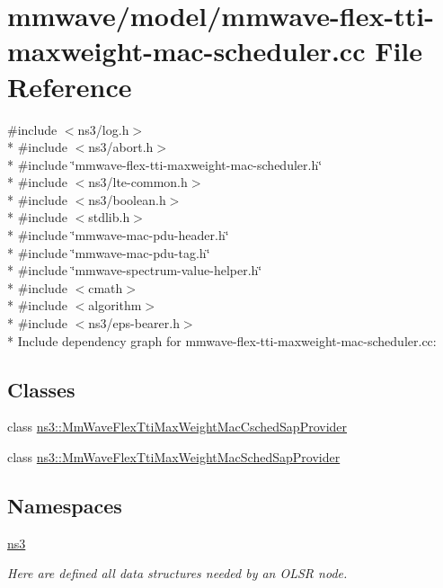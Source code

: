 \hypertarget{mmwave-flex-tti-maxweight-mac-scheduler_8cc}{}\section{mmwave/model/mmwave-\/flex-\/tti-\/maxweight-\/mac-\/scheduler.cc File Reference}
\label{mmwave-flex-tti-maxweight-mac-scheduler_8cc}
{\ttfamily \#include $<$ns3/log.\+h$>$}\\*
{\ttfamily \#include $<$ns3/abort.\+h$>$}\\*
{\ttfamily \#include \char`\"{}mmwave-\/flex-\/tti-\/maxweight-\/mac-\/scheduler.\+h\char`\"{}}\\*
{\ttfamily \#include $<$ns3/lte-\/common.\+h$>$}\\*
{\ttfamily \#include $<$ns3/boolean.\+h$>$}\\*
{\ttfamily \#include $<$stdlib.\+h$>$}\\*
{\ttfamily \#include \char`\"{}mmwave-\/mac-\/pdu-\/header.\+h\char`\"{}}\\*
{\ttfamily \#include \char`\"{}mmwave-\/mac-\/pdu-\/tag.\+h\char`\"{}}\\*
{\ttfamily \#include \char`\"{}mmwave-\/spectrum-\/value-\/helper.\+h\char`\"{}}\\*
{\ttfamily \#include $<$cmath$>$}\\*
{\ttfamily \#include $<$algorithm$>$}\\*
{\ttfamily \#include $<$ns3/eps-\/bearer.\+h$>$}\\*
Include dependency graph for mmwave-\/flex-\/tti-\/maxweight-\/mac-\/scheduler.cc\+:
\subsection*{Classes}
\begin{DoxyCompactItemize}
\item 
class \hyperlink{classns3_1_1MmWaveFlexTtiMaxWeightMacCschedSapProvider}{ns3\+::\+Mm\+Wave\+Flex\+Tti\+Max\+Weight\+Mac\+Csched\+Sap\+Provider}
\item 
class \hyperlink{classns3_1_1MmWaveFlexTtiMaxWeightMacSchedSapProvider}{ns3\+::\+Mm\+Wave\+Flex\+Tti\+Max\+Weight\+Mac\+Sched\+Sap\+Provider}
\end{DoxyCompactItemize}
\subsection*{Namespaces}
\begin{DoxyCompactItemize}
\item 
 \hyperlink{namespacens3}{ns3}
\begin{DoxyCompactList}\small\item\em Here are defined all data structures needed by an O\+L\+SR node. \end{DoxyCompactList}\end{DoxyCompactItemize}
